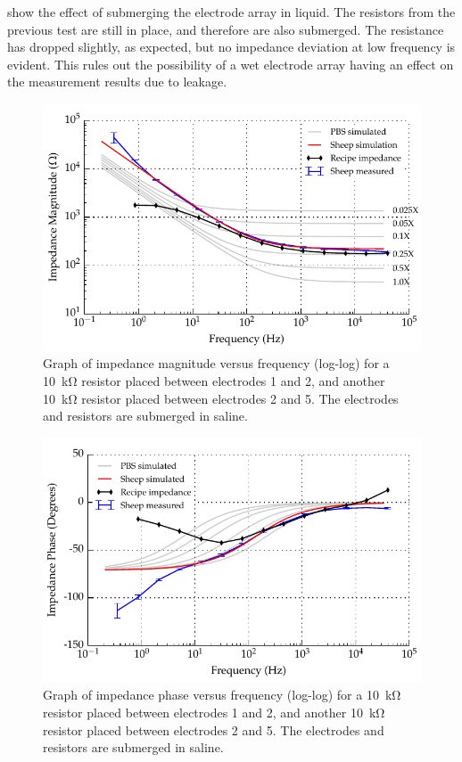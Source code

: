  show the effect of submerging the electrode array in liquid. The resistors from the previous test are still in place, and therefore are also submerged.
The resistance has dropped slightly, as expected, but no impedance deviation at low frequency is evident.
This rules out the possibility of a wet electrode array having an effect on the measurement results due to leakage.

\begin{figure}
    \centering
    \includegraphics[width=\textwidth]{content/appendices/Solution-Impedance-Measurements/graphics/run14_calibration_10k_water_salt_amended_ZVsF_graph_mag}
    \caption{\label{fig:calibration_10kRes_saline_mag}Graph of impedance magnitude versus frequency (log-log) for a \SI{10}{\kilo\ohm} resistor placed between electrodes 1 and 2, and another \SI{10}{\kilo\ohm} resistor placed between electrodes 2 and 5. The electrodes and resistors are submerged in saline.}
\end{figure}

\begin{figure}
    \centering
    \includegraphics[width=\textwidth]{content/appendices/Solution-Impedance-Measurements/graphics/run14_calibration_10k_water_salt_amended_ZVsF_graph_phase}
    \caption{\label{fig:calibration_10kRes_saline_phase}Graph of impedance phase versus frequency (log-log) for a \SI{10}{\kilo\ohm} resistor placed between electrodes 1 and 2, and another \SI{10}{\kilo\ohm} resistor placed between electrodes 2 and 5. The electrodes and resistors are submerged in saline.}
\end{figure}

